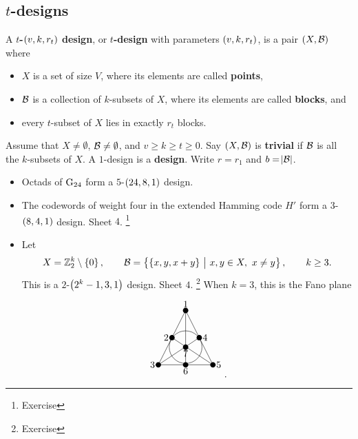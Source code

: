 \subsection{\texorpdfstring{$ t $}{t}-designs}

\begin{definition*}
A \textbf{$ t $-$ \br{v, k, r_t} $ design}, or \textbf{$ t $-design} with parameters $ \br{v, k, r_t} $, is a pair $ \br{X, \BBB} $ where
\begin{itemize}
\item $ X $ is a set of size $ V $, where its elements are called \textbf{points},
\item $ \mathcal{B} $ is a collection of $ k $-subsets of $ X $, where its elements are called \textbf{blocks}, and
\item every $ t $-subset of $ X $ lies in exactly $ r_t $ blocks.
\end{itemize}
Assume that $ X \ne \emptyset $, $ \mathcal{B} \ne \emptyset $, and $ v \ge k \ge t \ge 0 $. Say $ \br{X, \BBB} $ is \textbf{trivial} if $ \mathcal{B} $ is all the $ k $-subsets of $ X $. A $ 1 $-design is a \textbf{design}. Write $ r = r_1 $ and $ b = \abs{\mathcal{B}} $.
\end{definition*}

\begin{example*}
\hfill
\begin{itemize}
\item Octads of $ \mathrm{G}_{24} $ form a $ 5 $-$ \br{24, 8, 1} $ design.
\item The codewords of weight four in the extended Hamming code $ H' $ form a $ 3 $-$ \br{8, 4, 1} $ design. Sheet $ 4 $. \footnote{Exercise}
\item Let
$$ X = \ZZ_2^k \setminus \cbr{0}, \qquad \BBB = \cbr{\cbr{x, y, x + y} \st x, y \in X, \ x \ne y}, \qquad k \ge 3. $$
This is a $ 2 $-$ \br{2^k - 1, 3, 1} $ design. Sheet $ 4 $. \footnote{Exercise} When $ k = 3 $, this is the Fano plane
$$
\begin{tikzpicture}
\fill (0, 0) circle (0.1) node[above]{$ 1 $};
\fill (-0.5, -1) circle (0.1) node[left]{$ 2 $};
\fill (0.5, -1) circle (0.1) node[right]{$ 4 $};
\fill (0, -1.35) circle (0.1) node[below]{$ 7 $};
\fill (-1, -2) circle (0.1) node[left]{$ 3 $};
\fill (0, -2) circle (0.1) node[below]{$ 6 $};
\fill (1, -2) circle (0.1) node[right]{$ 5 $};
\draw (0, 0) to (-1, -2);
\draw (0, 0) to (0, -2);
\draw (0, 0) to (1, -2);
\draw (-0.5, -1) to (1, -2);
\draw (0.5, -1) to (-1, -2);
\draw (-1, -2) to (1, -2);
\draw (0, -1.35) circle (0.6);
\end{tikzpicture}.
$$
\end{itemize}
\end{example*}

